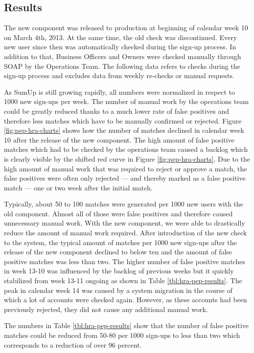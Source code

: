 \documentclass[a4paper, oneside]{csthesis}
\begin{document}
\subsection{Results}

The new component was released to production at beginning of calendar week 10 on March 4th, 2013. At the same time, the old check was discontinued. Every new user since then was automatically checked during the sign-up process. In addition to that, Business Officers and Owners were checked manually through SOAP by the Operations Team. The following data refers to checks during the sign-up process and excludes data from weekly re-checks or manual requests.

As SumUp is still growing rapidly, all numbers were normalized in respect to 1000 new sign-ups per week. The number of manual work by the operations team could be greatly reduced thanks to a much lower rate of false positives and therefore less matches which have to be manually confirmed or rejected. Figure \ref{fig:pep-hra-charts} shows how the number of matches declined in calendar week 10 after the release of the new component.
The high amount of false positive matches which had to be checked by the operations team caused a backlog which is clearly visible by the shifted red curve in Figure \ref{fig:pep-hra-charts}. Due to the high amount of manual work that was required to reject or approve a match, the false positives were often only rejected --- and thereby marked as a false positive match  --- one or two week after the initial match.

Typically, about 50 to 100 matches were generated per 1000 new users with the old component. Almost all of those were false positives and therefore caused unnecessary manual work. With the new component, we were able to drastically reduce the amount of manual work required. After introduction of the new check to the system, the typical amount of matches per 1000 new sign-ups after the release of the new component declined to below ten and the amount of false positive matches was less than two. The higher number of false positive matches in week 13-10 was influenced by the backlog of previous weeks but it quickly stabilized from week 13-11 ongoing as shown in Table \ref{tbl:hra-pep-results}. The peak in calendar week 14 was caused by a system migration in the course of which a lot of accounts were checked again. However, as these accounts had been previously rejected, they did not cause any additional manual work.

The numbers in Table \ref{tbl:hra-pep-results} show that the number of false positive matches could be reduced from 50-80 per 1000 sign-ups to less than two which corresponds to a reduction of over 96 percent.
\end{document}
